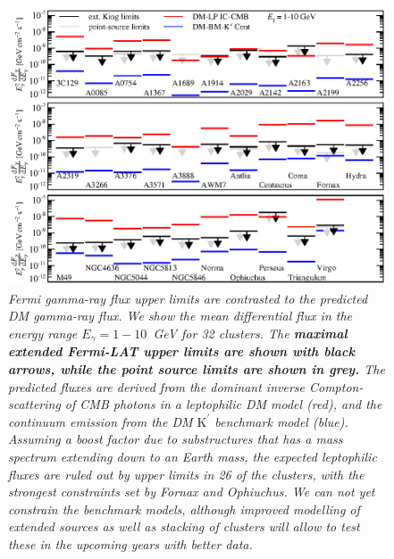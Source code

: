 \documentclass[10pt,aps,pra,reprint,amsmath,amsfonts,amssymb,showpacs,nofootinbib,floatfix]{revtex4-1}
\def\C#1{{\bf #1}}
\newcommand{\rmn}{\mathrm}
\newcommand{\Kp}{\rmn{K}^\prime}
\begin{document}
\begin{figure}
\begin{minipage}{2.0\columnwidth}
  \includegraphics[width=0.99\columnwidth]{figures/Fermi.comp.DM.eps}
  \caption{\it Fermi gamma-ray flux upper limits are contrasted to the
    predicted DM gamma-ray flux. We show the mean differential flux in
    the energy range $E_\gamma=1-10$~GeV for 32 clusters. The
    \C{maximal extended Fermi-LAT upper limits are shown with black
      arrows, while the point source limits are shown in grey.} The
    predicted fluxes are derived from the dominant inverse
    Compton-scattering of CMB photons in a leptophilic DM model (red),
    and the continuum emission from the DM $\Kp$ benchmark model
    (blue). Assuming a boost factor due to substructures that has a
    mass spectrum extending down to an Earth mass, the expected
    leptophilic fluxes are ruled out by upper limits in 26 of the
    clusters, with the strongest constraints set by Fornax and
    Ophiuchus. We can not yet constrain the benchmark models,
    although improved modelling of extended sources as well as
    stacking of clusters will allow to test these in the upcoming
    years with better data.}
 \label{fig14}
\end{minipage}
\end{figure}
\end{document}
